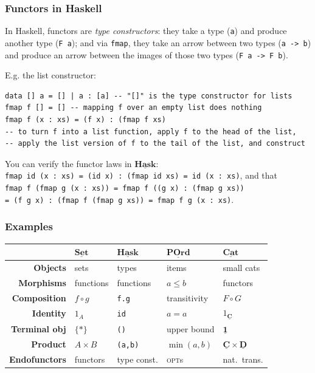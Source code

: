 \documentclass[10pt]{beamer}
\newcommand{\Cat}[1]{\ensuremath{\underline{\mathbf{#1}}}}
\theoremstyle{definition}
\theoremstyle{remark}
\numberwithin{equation}{section}
\begin{document}
\begin{frame}
  \frametitle{Functors in Haskell}

  In Haskell, functors are \emph{type constructors}: they take a type (\lstinline{a}) and produce another type (\lstinline{F a}); and via \lstinline{fmap}, they take an arrow between two
  types (\lstinline{a -> b}) and produce an arrow between the images of those
  two types (\lstinline{F a -> F b}).

  E.g. the list constructor:
\begin{lstlisting}[frame=single]
data [] a = [] | a : [a] -- "[]" is the type constructor for lists
fmap f [] = [] -- mapping f over an empty list does nothing
fmap f (x : xs) = (f x) : (fmap f xs)
-- to turn f into a list function, apply f to the head of the list,
-- apply the list version of f to the tail of the list, and construct
\end{lstlisting}

  You can verify the functor laws in \Cat{Hask}:\\
  \lstinline{fmap id (x : xs) = (id x) : (fmap id xs) = id (x : xs)}, and that\\
  \lstinline{fmap f (fmap g (x : xs)) = fmap f ((g x) : (fmap g xs))}\\
  \lstinline{= (f g x) : (fmap f (fmap g xs)) = fmap f g (x : xs)}.
\end{frame}

\begin{frame}[fragile]
  \frametitle{Examples}
  \begin{tabular}{r l l l l}\toprule
    & $\Cat{Set}$ & $\Cat{Hask}$ & $\Cat{POrd}$ & $\Cat{Cat}$ \\\midrule
    \textbf{Objects} & sets & types & items & small cats \\
    \textbf{Morphisms} & functions & functions & $a \leq b$ & functors \\
    \textbf{Composition} & $f \circ g$ & \lstinline!f.g! & transitivity & $F \circ G$ \\
    \textbf{Identity} & $1_A$ & {\lstinline!id!} & $a = a$ & $1_{\Cat{C}}$ \\
    \textbf{Terminal obj\rlap{.}} & $\{*\}$ & \lstinline!()! & upper bound & $\Cat{1}$ \\
    \textbf{Product} & $A \times B$ & \lstinline!(a,b)! & $\min(a,b)$ & $\Cat{C} \times \Cat{D}$ \\
    \textbf{Endofunctors} & functors & type const. & \textsc{opt}s & nat.\ trans.\\\bottomrule
  \end{tabular}
\end{frame}
\end{document}
